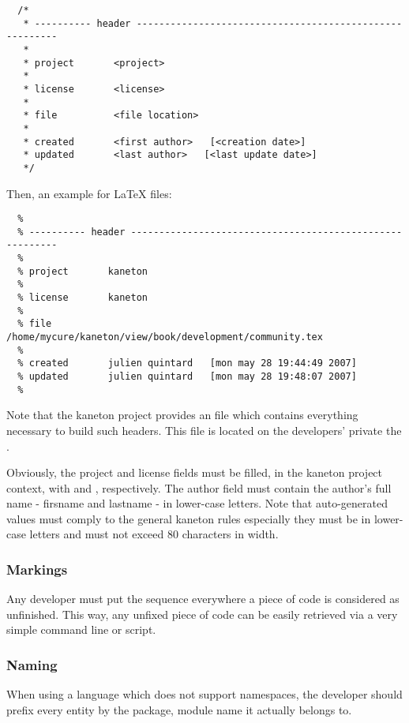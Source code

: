 \begin{verbatim}
  /*
   * ---------- header --------------------------------------------------------
   *
   * project       <project>
   *
   * license       <license>
   *
   * file          <file location>
   *
   * created       <first author>   [<creation date>]
   * updated       <last author>   [<last update date>]
   */
\end{verbatim}

Then, an example for {\LaTeX} files:

\begin{verbatim}
  %
  % ---------- header ---------------------------------------------------------
  %
  % project       kaneton
  %
  % license       kaneton
  %
  % file          /home/mycure/kaneton/view/book/development/community.tex
  %
  % created       julien quintard   [mon may 28 19:44:49 2007]
  % updated       julien quintard   [mon may 28 19:48:07 2007]
  %
\end{verbatim}

Note that the kaneton project provides an  file which contains
everything necessary to build such headers. This file is located on the
developers' private  \aka{} the .

Obviously, the project and license fields must be filled, in the kaneton
project context, with  and , respectively. The
author field must contain the author's full name - firsname and lastname -
in lower-case letters. Note that auto-generated values must comply to
the general kaneton rules especially they must be in lower-case letters and
must not exceed $80$ characters in width.


\subsubsection{Markings}

Any developer must put the sequence  everywhere a piece of code
is considered as unfinished. This way, any unfixed piece of code can be
easily retrieved via a very simple command line or script.


\subsubsection{Naming}

When using a language which does not support namespaces, the developer should
prefix every entity by the package, module \etc{} name it actually belongs to.

